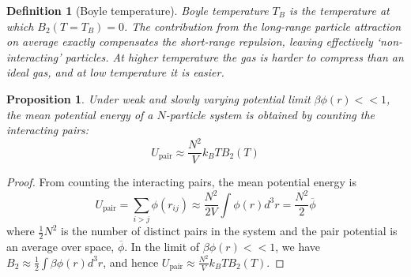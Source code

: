\documentclass[a4paper]{article}
\theoremstyle{new}
\newtheorem{defi}{Definition}[section]
\newtheorem{prop}{Proposition}[section]
\begin{document}
\begin{defi}[Boyle temperature]
Boyle temperature $T_B$ is the temperature at which $B_2(T=T_B)=0$. The contribution from the long-range particle attraction on average exactly compensates the short-range repulsion, leaving effectively `non-interacting' particles. At higher temperature the gas is harder to compress than an ideal gas, and at low temperature it is easier.
\end{defi}
\begin{prop}
Under weak and slowly varying potential limit $\beta\phi(r)<<1$, the mean potential energy of a $N$-particle system is obtained by counting the interacting pairs:
$$U_{\text{pair}}\approx\frac{N^2}{V}k_BTB_2(T)$$
\end{prop}
\begin{proof}
From counting the interacting pairs, the mean potential energy is
$$U_{\text{pair}}=\sum_{i>j}\phi(r_{ij})\approx\frac{N^2}{2V}\int\phi(r)d^3r=\frac{N^2}{2}\overline{\phi}$$
where $\frac{1}{2}N^2$ is the number of distinct pairs in the system and the pair potential is an average over space, $\overline{\phi}$. In the limit of $\beta\phi(r)<<1$, we have $B_2\approx\frac{1}{2}\int\beta\phi(r)d^3r$, and hence $U_{\text{pair}}\approx\frac{N^2}{V}k_BTB_2(T)$.
\end{proof}
\newpage
\end{document}
